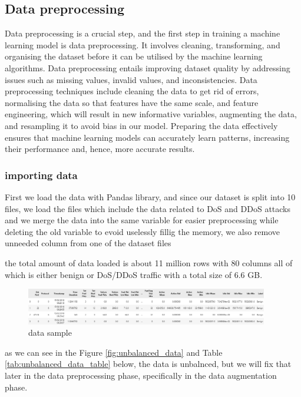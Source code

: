 \subsection{Data preprocessing}
Data preprocessing is a crucial step, and the first step in training a machine learning model is data preprocessing. It involves cleaning, transforming, and organising the dataset before it can be utilised by the machine learning algorithms. Data preprocessing entails improving dataset quality by addressing issues such as missing values, invalid values, and inconsistencies. Data preprocessing techniques include cleaning the data to get rid of errors, normalising the data so that features have the same scale, and feature engineering, which will result in new informative variables, augmenting the data, and resampling it to avoid bias in our model. Preparing the data effectively ensures that machine learning models can accurately learn patterns, increasing their performance and, hence, more accurate results.



\subsubsection{importing data}
First we load the data with Pandas library, and since our dataset is split into 10 files, we load the files which include the data related to DoS and DDoS attacks and we merge the data into the same variable for easier preprocessing while deleting the old variable to evoid uselessly fillig the memory, we also remove unneeded column from one of the dataset files



the total amount of data loaded is about 11 million rows with 80 columns all of which is either benign or DoS/DDoS traffic with a total size of 6.6 GB.

\begin{figure}[h]
	\centering
	\includegraphics[width=400px]{figures/data_example.png}
	\caption{data sample}
	\label{fig:datasample}
\end{figure}

as we can see in the Figure \ref{fig:unbalanced_data} and Table \ref{tab:unbalanced_data_table} below, the data is unbalnced, but we will fix that later in the data preprocessing phase, specifically in the data augmentation phase.

